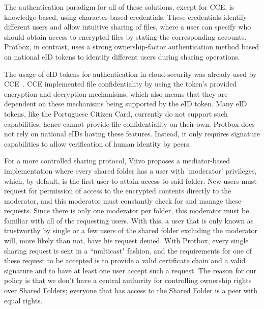 \documentclass[english]{lni}
\newcommand\protbox{Protbox}
\newcommand\SharedF{Shared Folder}
\newcommand\SharedFs{Shared Folders}
\begin{document}
The authentication paradigm for all of these solutions, except
for CCE, is
knowledge-based, using character-based credentials.
These credentials identify different users
and allow intuitive sharing of files, where a user can specify who
should obtain access to encrypted files by stating the corresponding
accounts. {\protbox}, in contrast, uses a strong ownership-factor
authentication method based on national eID tokens to identify
different users during sharing operations.

The usage of eID tokens for authentication in cloud-security
was already used by CCE~\cite{cce}. CCE implemented
file confidentiality by using the token's provided encryption and
decryption mechanisms, which also means that they are dependent
on these mechanisms being supported by the eID token. Many eID
tokens, like the Portuguese Citizen Card, currently do not support
such capabilities, hence cannot provide file confidentiality
on their own. {\protbox} does not rely on national eIDs having these
features. Instead, it only requires signature capabilities
to allow verification of human identity by peers.














 




















For a more controlled sharing protocol,
Viivo proposes a mediator-based implementation where every shared folder
has a user with
'moderator' privileges, which, by default, is the first
user to attain access to said folder. New users must
request for permission of access to the encrypted contents directly to
the moderator, and this moderator must constantly check for and manage
these requests. Since there is
only one moderator per folder, this moderator must be familiar with
all of the requesting users. With this, a user that is only known as
trustworthy by single or a few users of the shared folder excluding
the moderator will, more likely than not, have his request denied.
With {\protbox}, every single sharing request is sent in a ``multicast"
fashion, and the requirements for one of these request to be accepted is
to provide a valid certificate chain and a valid signature and to have
at least one user accept such a request. The reason for our policy
is that we don't have a central authority for controlling ownership
rights over {\SharedFs}; everyone that has access to the {\SharedF}
is a peer with equal rights.
\end{document}
